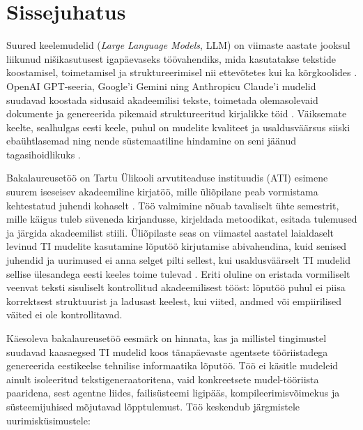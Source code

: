 \section{Sissejuhatus} \label{sissejuhatus}

Suured keelemudelid (\textit{Large Language Models}, LLM) on viimaste aastate jooksul liikunud nišikasutusest igapäevaseks töövahendiks, mida kasutatakse tekstide koostamisel, toimetamisel ja struktureerimisel nii ettevõtetes kui ka kõrgkoolides \cite{liang2024mapping}. OpenAI GPT-seeria, Google'i Gemini ning Anthropicu Claude'i mudelid suudavad koostada sidusaid akadeemilisi tekste, toimetada olemasolevaid dokumente ja genereerida pikemaid struktureeritud kirjalikke töid \cite{brown2020language, openai2024gpt4}. Väiksemate keelte, sealhulgas eesti keele, puhul on mudelite kvaliteet ja usaldusväärsus siiski ebaühtlasemad ning nende süstemaatiline hindamine on seni jäänud tagasihoidlikuks \cite{kuulmets2025finno, dorkin2026estllm}.

Bakalaureusetöö on Tartu Ülikooli arvutiteaduse instituudis (ATI) esimene suurem iseseisev akadeemiline kirjatöö, mille üliõpilane peab vormistama kehtestatud juhendi kohaselt \cite{tuati2026juhend}. Töö valmimine nõuab tavaliselt ühte semestrit, mille käigus tuleb süveneda kirjandusse, kirjeldada metoodikat, esitada tulemused ja järgida akadeemilist stiili. Üliõpilaste seas on viimastel aastatel laialdaselt levinud TI mudelite kasutamine lõputöö kirjutamise abivahendina, kuid senised juhendid ja uurimused ei anna selget pilti sellest, kui usaldusväärselt TI mudelid sellise ülesandega eesti keeles toime tulevad \cite{lund2025perceptions, rodafinos2025integration}. Eriti oluline on eristada vormiliselt veenvat teksti sisuliselt kontrollitud akadeemilisest tööst: lõputöö puhul ei piisa korrektsest struktuurist ja ladusast keelest, kui viited, andmed või empiirilised väited ei ole kontrollitavad.

Käesoleva bakalaureusetöö eesmärk on hinnata, kas ja millistel tingimustel suudavad kaasaegsed TI mudelid koos tänapäevaste agentsete tööriistadega genereerida eestikeelse tehnilise informaatika lõputöö. Töö ei käsitle mudeleid ainult isoleeritud tekstigeneraatoritena, vaid konkreetsete mudel-tööriista paaridena, sest agentne liides, failisüsteemi ligipääs, kompileerimisvõimekus ja süsteemijuhised mõjutavad lõpptulemust. Töö keskendub järgmistele uurimisküsimustele:

